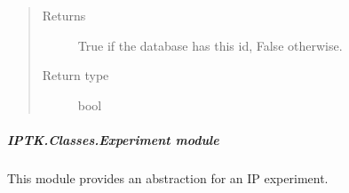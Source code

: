 \documentclass[letterpaper,10pt,english]{sphinxmanual}
\begin{document}
\begin{fulllineitems}
\begin{fulllineitems}
\begin{quote}
\begin{description}
\item[{Returns}] \leavevmode
True if the database has this id, False otherwise.

\item[{Return type}] \leavevmode
bool

\end{description}\end{quote}

\end{fulllineitems}


\end{fulllineitems}



\subparagraph{IPTK.Classes.Experiment module}
\label{\detokenize{IPTK.Classes:module-IPTK.Classes.Experiment}}\label{\detokenize{IPTK.Classes:iptk-classes-experiment-module}}
This module provides an abstraction for an IP experiment.
\end{document}
